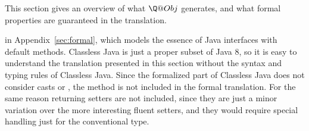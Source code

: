 This section gives an overview of what $\mixinAnn$ generates,
 and what formal properties are guaranteed in the translation.

 in Appendix~\ref{sec:formal}, which models the essence of
Java interfaces with default methods.
 Classless Java is just a proper subset of Java 8, so
it is easy to understand the translation presented in this section
without the syntax and typing rules of Classless Java.
Since the formalized part of Classless Java does not consider casts or \Q@instanceof@,
the \Q@with@ method is not included in the
formal translation. For the same reason \Q@void@ returning setters are
not included, since they are just a minor variation over the more
interesting fluent setters, and they would require special handling
just for the conventional \Q@void@ type.

